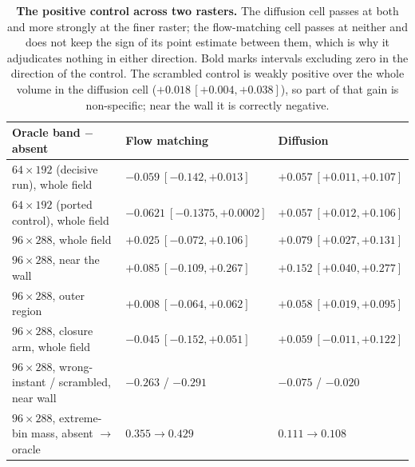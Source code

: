 \documentclass[11pt]{article}
\begin{document}
\begin{table}[h]
\centering
\footnotesize
\begin{tabular}{@{}P{4.4cm}P{4.3cm}P{4.3cm}@{}}
\toprule
Oracle band $-$ absent & Flow matching & Diffusion \\
\midrule
$64\times192$ (decisive run), whole field & $-0.059\ [-0.142,+0.013]$ & $\mathbf{+0.057\ [+0.011,+0.107]}$ \\
$64\times192$ (ported control), whole field & $-0.0621\ [-0.1375,+0.0002]$ & $\mathbf{+0.057\ [+0.012,+0.106]}$ \\
$96\times288$, whole field & $+0.025\ [-0.072,+0.106]$ & $\mathbf{+0.079\ [+0.027,+0.131]}$ \\
$96\times288$, near the wall & $+0.085\ [-0.109,+0.267]$ & $\mathbf{+0.152\ [+0.040,+0.277]}$ \\
$96\times288$, outer region & $+0.008\ [-0.064,+0.062]$ & $\mathbf{+0.058\ [+0.019,+0.095]}$ \\
$96\times288$, closure arm, whole field & $-0.045\ [-0.152,+0.051]$ & $+0.059\ [-0.011,+0.122]$ \\
$96\times288$, wrong-instant / scrambled, near wall & $-0.263$ / $-0.291$ & $-0.075$ / $-0.020$ \\
$96\times288$, extreme-bin mass, absent $\to$ oracle & $0.355\to0.429$ & $0.111\to0.108$ \\
\bottomrule
\end{tabular}
\caption{\textbf{The positive control across two rasters.} The diffusion cell passes at both and
more strongly at the finer raster; the flow-matching cell passes at neither and does not keep
the sign of its point estimate between them, which is why it adjudicates nothing
in either direction. Bold marks intervals excluding zero in the direction of the control. The
scrambled control is weakly positive over the whole volume in the diffusion cell
($+0.018\,[+0.004,+0.038]$), so part of that gain is non-specific; near the wall it
is correctly negative.}\label{tab:s-res}
\end{table}
\end{document}
